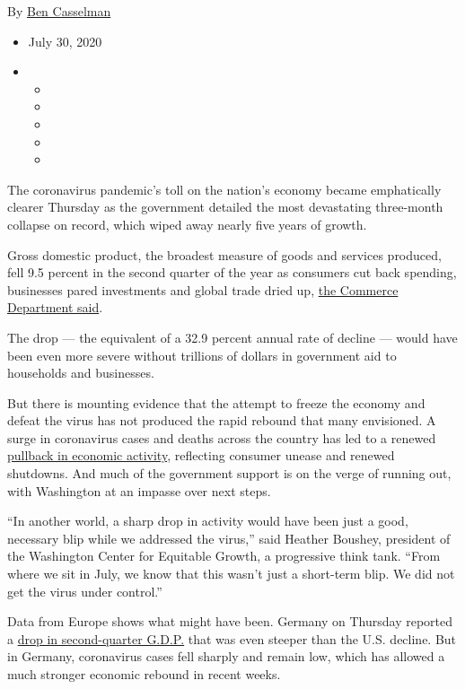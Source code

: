By \href{https://www.nytimes3xbfgragh.onion/by/ben-casselman}{Ben
Casselman}

\begin{itemize}
\item
  July 30, 2020
\item
  \begin{itemize}
  \item
  \item
  \item
  \item
  \item
  \end{itemize}
\end{itemize}

The coronavirus pandemic's toll on the nation's economy became
emphatically clearer Thursday as the government detailed the most
devastating three-month collapse on record, which wiped away nearly five
years of growth.

Gross domestic product, the broadest measure of goods and services
produced, fell 9.5 percent in the second quarter of the year as
consumers cut back spending, businesses pared investments and global
trade dried up,
\href{https://www.bea.gov/sites/default/files/2020-07/gdp2q20_adv.pdf}{the
Commerce Department said}.

The drop --- the equivalent of a 32.9 percent annual rate of decline ---
would have been even more severe without trillions of dollars in
government aid to households and businesses.

But there is mounting evidence that the attempt to freeze the economy
and defeat the virus has not produced the rapid rebound that many
envisioned. A surge in coronavirus cases and deaths across the country
has led to a renewed
\href{https://www.nytimes3xbfgragh.onion/2020/07/15/business/economy/economic-recovery-coronavirus-resurgence.html?action=click\&module=RelatedLinks\&pgtype=Article}{pullback
in economic activity}, reflecting consumer unease and renewed shutdowns.
And much of the government support is on the verge of running out, with
Washington at an impasse over next steps.

``In another world, a sharp drop in activity would have been just a
good, necessary blip while we addressed the virus,'' said Heather
Boushey, president of the Washington Center for Equitable Growth, a
progressive think tank. ``From where we sit in July, we know that this
wasn't just a short-term blip. We did not get the virus under control.''

Data from Europe shows what might have been. Germany on Thursday
reported a
\href{https://www.nytimes3xbfgragh.onion/live/2020/07/30/business/stock-market-today-coronavirus/the-german-economy-had-its-biggest-slump-in-50-years}{drop
in second-quarter G.D.P.} that was even steeper than the U.S. decline.
But in Germany, coronavirus cases fell sharply and remain low, which has
allowed a much stronger economic rebound in recent weeks.

